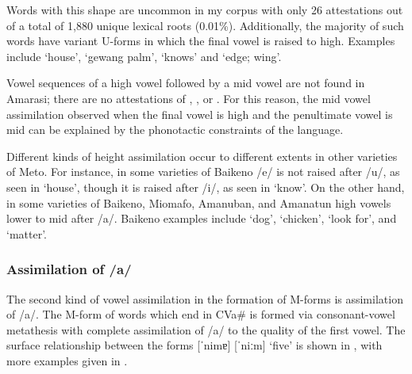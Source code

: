 Words with this shape are uncommon in my corpus
with only 26 attestations out of a total of 1,880 unique lexical roots (0.01\%).
Additionally, the majority of such words have
variant U-forms in which the final vowel is raised to high.
Examples include  {\tl}  `house',
 {\tl}  `gewang palm',
 {\tl}  `knows'
and  {\tl}  `edge; wing'.

Vowel sequences of a high vowel followed by a mid vowel are not found in Amarasi;
there are no attestations of , ,  or .
For this reason, the mid vowel assimilation observed when the final vowel
is high and the penultimate vowel is mid
can be explained by the phonotactic constraints of the language.

Different kinds of height assimilation occur to different
extents in other varieties of Meto.
For instance, in some varieties of Baikeno
/e/ is not raised after /u/, as seen in  {\ra}  `house',
though it is raised after /i/, as seen in  {\ra}  `know'.
On the other hand, in some varieties of Baikeno, Miomafo, Amanuban, and
Amanatun high vowels lower to mid after /a/.
Baikeno examples include  {\ra}  `dog',
 {\ra}  `chicken',  {\ra}  `look for',
and  {\ra}  `matter'.

\subsubsection{Assimilation of /a/}\label{sec:AssOfA}
The second kind of vowel assimilation in the formation of M-forms is assimilation of /a/.
The M-form of words which end in CVa{\#} is formed via consonant-vowel metathesis with
complete assimilation of /a/ to the quality of the first vowel.
The surface relationship between the forms
 [ˈnimɐ] {\ra}  [ˈniːm] `five' is shown in ,
with more examples given in .

